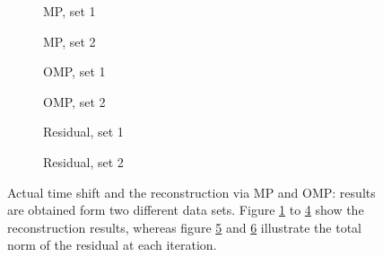 \documentclass[10pt,a4paper]{article}
\begin{document}
\begin{figure}[ht]
	\begin{subfigure}{.5\textwidth}
		\centering
		\caption{MP, set 1}
		\label{fig:ahatMP_50}
	\end{subfigure}
	\begin{subfigure}{.5\textwidth}
		\centering
		\caption{MP, set 2}
		\label{fig:ahatMP_50_2}
	\end{subfigure}
	\newline
	\begin{subfigure}{.5\textwidth}
		\centering
		\caption{OMP,  set 1}
		\label{fig:ahatOMP_50}
	\end{subfigure}
	\begin{subfigure}{.5\textwidth}
		\centering
		\caption{OMP, set 2}
		\label{fig:ahatOMP_50_2}
	\end{subfigure}
	\newline
	\begin{subfigure}{.5\textwidth}
		\centering
		\caption{Residual, set 1}
		\label{fig:error_50}
	\end{subfigure}
	\begin{subfigure}{.5\textwidth}
		\centering
		\caption{Residual, set 2}
		\label{fig:error_50_2}
	\end{subfigure}
\caption{Actual time shift and the reconstruction via MP and OMP: results are obtained form two different data sets. Figure \ref{fig:ahatMP_50} to \ref{fig:ahatOMP_50_2} show the reconstruction results, whereas figure \ref{fig:error_50} and \ref{fig:error_50_2} illustrate the total norm of the residual at each iteration.}
\label{fig:results}
\end{figure}
\end{document}

